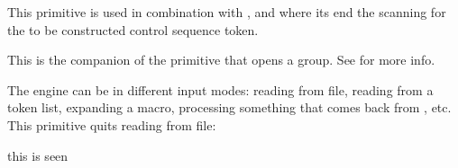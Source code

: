 This primitive is used in combination with ,  and
 where its end the scanning for the to be constructed control
sequence token.

\stopoldprimitive

\startoldprimitive[title={\prm {endgroup}}]

This is the companion of the  primitive that opens a group. See
 for more info.

\stopoldprimitive

\startoldprimitive[title={\prm {endinput}}]

The engine can be in different input modes: reading from file, reading from a
token list, expanding a macro, processing something that comes back from \LUA,
etc. This primitive quits reading from file:

\startbuffer
this is seen
\endinput
here we're already quit
\stopbuffer

\typebuffer

There is a catch. This is what the above gives:

\getbuffer

but how about this:

\startbuffer
this is seen
before \endinput after
here we're already quit
\stopbuffer

\typebuffer

Here we get:

\getbuffer

Because a token list is one line, the following works okay:

\starttyping
\def\quitrun{\ifsomething \endinput \fi}
\stoptyping

but in a file you'd have to do this when you quit in a conditional:

\starttyping
\ifsomething
    \expandafter \endinput
\fi
\stoptyping

While the one|-|liner works as expected:

\starttyping
\ifsomething \endinput \fi
\stoptyping

\stopoldprimitive

\startoldprimitive[title={\prm {endlinechar}}]

This is an internal integer register. When set to positive value the character
with that code point will be appended to the line. The current value is \the
\endlinechar. Here is an example:

\startbuffer
\endlinechar\hyphenasciicode
line 1
line 2
\stopbuffer

